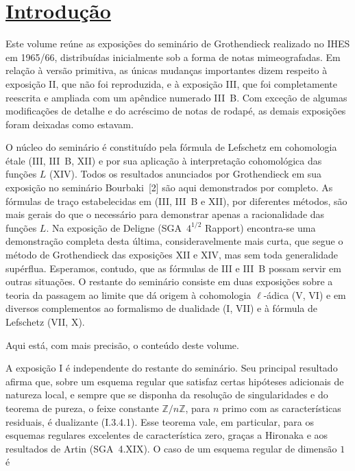\thispagestyle{empty}
\section*{\uline{Introdução}}

Este volume reúne as exposições do seminário de Grothendieck realizado no IHES em 1965/66, distribuídas inicialmente sob a forma de notas mimeografadas. Em relação à versão primitiva, as únicas mudanças importantes dizem respeito à exposição II, que não foi reproduzida, e à exposição III, que foi completamente reescrita e ampliada com um apêndice numerado III~B. Com exceção de algumas modificações de detalhe e do acréscimo de notas de rodapé, as demais exposições foram deixadas como estavam.

O núcleo do seminário é constituído pela fórmula de Lefschetz em cohomologia étale (III, III~B, XII) e por sua aplicação à interpretação cohomológica das funções $L$ (XIV). Todos os resultados anunciados por Grothendieck em sua exposição no seminário Bourbaki~[2] são aqui demonstrados por completo. As fórmulas de traço estabelecidas em (III, III~B e XII), por diferentes métodos, são mais gerais do que o necessário para demonstrar apenas a racionalidade das funções $L$. Na exposição de Deligne (SGA~$4^{1/2}$ Rapport) encontra-se uma demonstração completa desta última, consideravelmente mais curta, que segue o método de Grothendieck das exposições XII e XIV, mas sem toda generalidade supérflua. Esperamos, contudo, que as fórmulas de III e III~B possam servir em outras situações. O restante do seminário consiste em duas exposições sobre a teoria da passagem ao limite que dá origem à cohomologia $\ell$-ádica (V, VI) e em diversos complementos ao formalismo de dualidade (I, VII) e à fórmula de Lefschetz (VII, X).

Aqui está, com mais precisão, o conteúdo deste volume.

A exposição I é independente do restante do seminário. Seu principal resultado afirma que, sobre um esquema regular que satisfaz certas hipóteses adicionais de natureza local, e sempre que se disponha da resolução de singularidades e do teorema de pureza, o feixe constante $\mathbb Z/n\mathbb Z$, para $n$ primo com as características residuais, é dualizante (I.3.4.1). Esse teorema vale, em particular, para os esquemas regulares excelentes de característica zero, graças a Hironaka e aos resultados de Artin (SGA~4.XIX). O caso de um esquema regular de dimensão $1$ é

